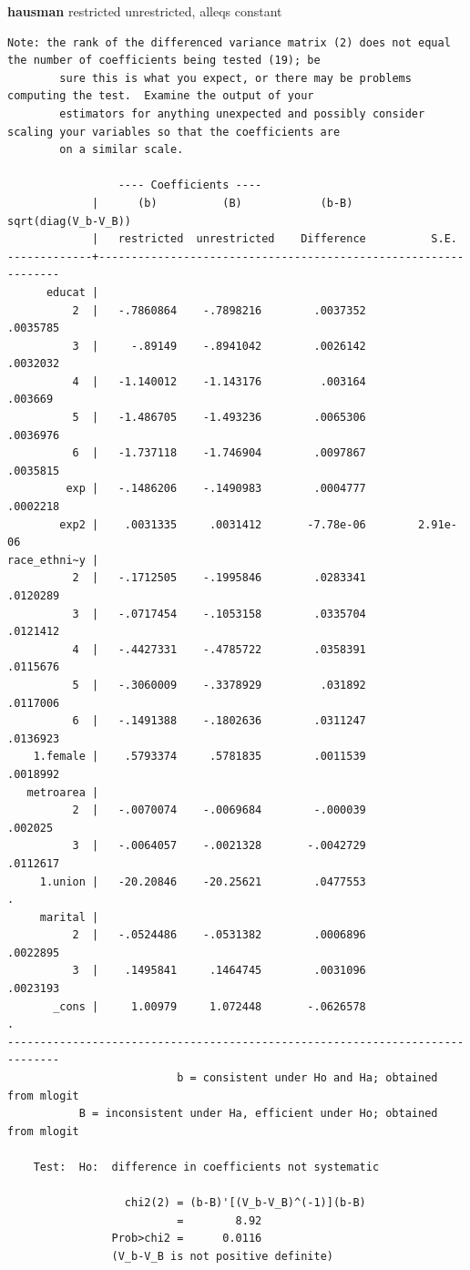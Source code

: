 \documentclass[
]{book}
\newenvironment{Shaded}{\begin{snugshade}}{\end{snugshade}}
\newcommand{\KeywordTok}[1]{\textcolor[rgb]{0.13,0.29,0.53}{\textbf{#1}}}
\newcommand{\NormalTok}[1]{#1}
\begin{document}
\begin{Shaded}
\begin{Highlighting}[]
\KeywordTok{hausman}\NormalTok{ restricted unrestricted, alleqs constant}
\end{Highlighting}
\end{Shaded}

\begin{verbatim}
Note: the rank of the differenced variance matrix (2) does not equal the number of coefficients being tested (19); be
        sure this is what you expect, or there may be problems computing the test.  Examine the output of your
        estimators for anything unexpected and possibly consider scaling your variables so that the coefficients are
        on a similar scale.

                 ---- Coefficients ----
             |      (b)          (B)            (b-B)     sqrt(diag(V_b-V_B))
             |   restricted  unrestricted    Difference          S.E.
-------------+----------------------------------------------------------------
      educat |
          2  |   -.7860864    -.7898216        .0037352        .0035785
          3  |     -.89149    -.8941042        .0026142        .0032032
          4  |   -1.140012    -1.143176         .003164         .003669
          5  |   -1.486705    -1.493236        .0065306        .0036976
          6  |   -1.737118    -1.746904        .0097867        .0035815
         exp |   -.1486206    -.1490983        .0004777        .0002218
        exp2 |    .0031335     .0031412       -7.78e-06        2.91e-06
race_ethni~y |
          2  |   -.1712505    -.1995846        .0283341        .0120289
          3  |   -.0717454    -.1053158        .0335704        .0121412
          4  |   -.4427331    -.4785722        .0358391        .0115676
          5  |   -.3060009    -.3378929         .031892        .0117006
          6  |   -.1491388    -.1802636        .0311247        .0136923
    1.female |    .5793374     .5781835        .0011539        .0018992
   metroarea |
          2  |   -.0070074    -.0069684        -.000039         .002025
          3  |   -.0064057    -.0021328       -.0042729        .0112617
     1.union |   -20.20846    -20.25621        .0477553               .
     marital |
          2  |   -.0524486    -.0531382        .0006896        .0022895
          3  |    .1495841     .1464745        .0031096        .0023193
       _cons |     1.00979     1.072448       -.0626578               .
------------------------------------------------------------------------------
                          b = consistent under Ho and Ha; obtained from mlogit
           B = inconsistent under Ha, efficient under Ho; obtained from mlogit

    Test:  Ho:  difference in coefficients not systematic

                  chi2(2) = (b-B)'[(V_b-V_B)^(-1)](b-B)
                          =        8.92
                Prob>chi2 =      0.0116
                (V_b-V_B is not positive definite)
\end{verbatim}
\end{document}

